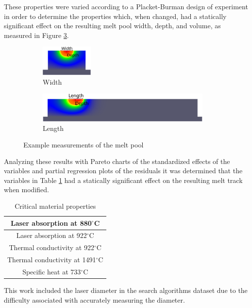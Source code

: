 \documentclass[pdflatex,sn-mathphys]{sn-jnl}
\newcommand{\degree}{$^\circ$}
\begin{document}
	These properties were varied according to a Placket-Burman design of experiment in order to determine the properties which, when changed, had a statically significant effect on the resulting melt pool width, depth, and volume, as measured in Figure \ref{fig:slices}.
	\begin{figure}[!tb]\centering
		\begin{subfigure}[t]{0.22\textwidth}\centering
		\includegraphics[height=0.6in]{slice_y_annotated}
		\caption{Width}
		\label{fig:slice_y_annotated}
		\end{subfigure}
			\begin{subfigure}[t]{0.77\textwidth}\centering
			\includegraphics[height=0.6in]{slice_x_annotated}
			\caption{Length}
			\label{fig:slice_x_annotated}
			\end{subfigure}
		\caption{Example measurements of the melt pool}
		\label{fig:slices}
	\end{figure}
	Analyzing these results with Pareto charts of the standardized effects of the variables and partial regression plots of the residuals it was determined that the variables in Table \ref{tab:crit_mat_prop} had a statically significant effect on the resulting melt track when modified.
	\begin{table}[!htb]
		\centering
		\caption{Critical material properties}
		\label{tab:crit_mat_prop}
			\begin{tabular}{|c|} \hline 
				Laser absorption at 880\degree C \\ \hline
				Laser absorption at 922\degree C \\ \hline
				Thermal conductivity at 922\degree C \\ \hline
				Thermal conductivity at 1491\degree C \\ \hline
				Specific heat at 733\degree C \\ \hline
			\end{tabular}
	\end{table}
	This work included the laser diameter in the search algorithms dataset due to the difficulty associated with accurately measuring the diameter.
\end{document}

